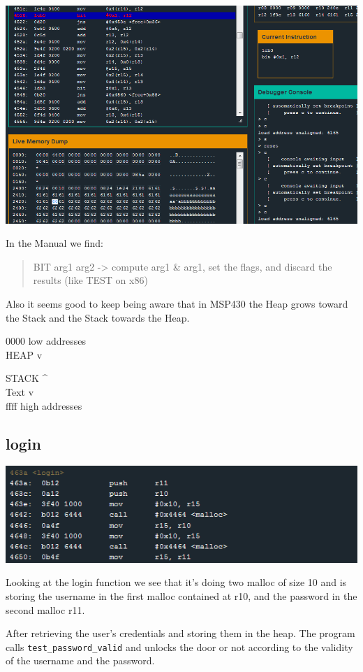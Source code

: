 \documentclass[a4paper,11pt]{article}
\begin{document}
\includegraphics{img/14_2.PNG}

In the Manual we find:

\begin{quote}
BIT arg1 arg2 -\textgreater{} compute arg1 \& arg1, set the flags, and
discard the results (like TEST on x86)
\end{quote}

Also it seems good to keep being aware that in MSP430 the Heap grows
toward the Stack and the Stack towards the Heap.

0000 low addresses\\HEAP v

STACK \^{}\\Text v\\ffff high addresses

\subsection{login}\label{login}

\includegraphics{img/14_3.PNG}

Looking at the login function we see that it's doing two malloc of size
10 and is storing the username in the first malloc contained at r10, and
the password in the second malloc r11.

After retrieving the user's credentials and storing them in the heap.
The program calls \texttt{test\_password\_valid} and unlocks the door or
not according to the validity of the username and the password.
\end{document}

